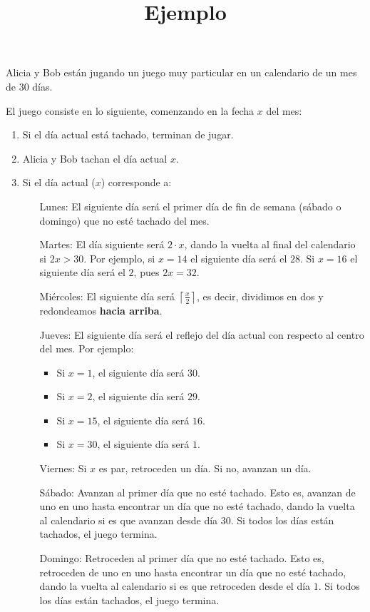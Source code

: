 \documentclass{oci}
\title{Ejemplo}
\begin{document}
\begin{problemDescription}
  Alicia y Bob están jugando un juego muy particular en un calendario de un mes de 30 días.

  El juego consiste en lo siguiente, comenzando en la fecha $x$ del mes:
  \begin{enumerate}
    \item Si el día actual está tachado, terminan de jugar.
    \item Alicia y Bob tachan el día actual $x$.
    \item Si el día actual ($x$) corresponde a:
    \begin{itemize}
      \item[Lunes:] El siguiente día será el primer día de fin de semana (sábado o domingo) que no esté tachado del mes.
      \item[Martes:] El día siguiente será $2 \cdot x$, dando la vuelta al final del calendario si $2x>30$. Por ejemplo, si $x = 14$ el siguiente día será el $28$. Si $x = 16$ el siguiente día será el $2$, pues $2x = 32$.
      \item[Miércoles:] El siguiente día será $\left\lceil\frac{x}{2}\right\rceil$, es decir, dividimos en dos y redondeamos \textbf{hacia arriba}.
      \item[Jueves:]  El siguiente día será el reflejo del día actual con respecto al centro del mes. Por ejemplo:
      \begin{itemize}
        \item Si $x=1$, el siguiente día será $30$.
        \item Si $x=2$, el siguiente día será $29$.
        \item Si $x=15$, el siguiente día será $16$.
        \item Si $x=30$, el siguiente día será $1$.
      \end{itemize}
      \item[Viernes:] Si $x$ es par, retroceden un día. Si no, avanzan un día.
      \item[Sábado:] Avanzan al primer día que no esté tachado. Esto es, avanzan de uno en uno hasta encontrar un día que no esté tachado, dando la vuelta al calendario si es que avanzan desde día $30$. Si todos los días están tachados, el juego termina.
      \item[Domingo:] Retroceden al primer día que no esté tachado. Esto es, retroceden de uno en uno hasta encontrar un día que no esté tachado, dando la vuelta al calendario si es que retroceden desde el día $1$. Si todos los días están tachados, el juego termina.
    \end{itemize}
  \end{enumerate}
\end{problemDescription}
\end{document}
